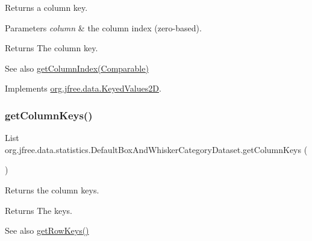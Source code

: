 Returns a column key.


\begin{DoxyParams}{Parameters}
{\em column} & the column index (zero-\/based).\\
\hline
\end{DoxyParams}
\begin{DoxyReturn}{Returns}
The column key.
\end{DoxyReturn}
\begin{DoxySeeAlso}{See also}
\mbox{\hyperlink{classorg_1_1jfree_1_1data_1_1statistics_1_1_default_box_and_whisker_category_dataset_a2c2546143d897b391809f172566a1e00}{get\+Column\+Index(\+Comparable)}} 
\end{DoxySeeAlso}


Implements \mbox{\hyperlink{interfaceorg_1_1jfree_1_1data_1_1_keyed_values2_d_a9ced6cbaf04f048db059e1ebf5184d2a}{org.\+jfree.\+data.\+Keyed\+Values2D}}.

\mbox{\label{classorg_1_1jfree_1_1data_1_1statistics_1_1_default_box_and_whisker_category_dataset_a0d4ff5c831a0e65c1b9658d00d04930d}} 
\subsubsection{\texorpdfstring{get\+Column\+Keys()}{getColumnKeys()}}
{\footnotesize\ttfamily List org.\+jfree.\+data.\+statistics.\+Default\+Box\+And\+Whisker\+Category\+Dataset.\+get\+Column\+Keys (\begin{DoxyParamCaption}{ }\end{DoxyParamCaption})}

Returns the column keys.

\begin{DoxyReturn}{Returns}
The keys.
\end{DoxyReturn}
\begin{DoxySeeAlso}{See also}
\mbox{\hyperlink{classorg_1_1jfree_1_1data_1_1statistics_1_1_default_box_and_whisker_category_dataset_a9b93cea941b50fd0a0b908bfa0b1e278}{get\+Row\+Keys()}} 
\end{DoxySeeAlso}


